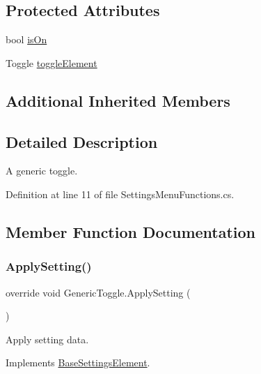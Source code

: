 \subsection*{Protected Attributes}
\begin{DoxyCompactItemize}
\item 
bool \hyperlink{class_generic_toggle_a04dcb99bc5c6b54f7bc880040c337622}{is\+On}
\item 
Toggle \hyperlink{class_generic_toggle_ad14be04e138af5b154ad5b9d9e98c1d1}{toggle\+Element}
\end{DoxyCompactItemize}
\subsection*{Additional Inherited Members}


\subsection{Detailed Description}
A generic toggle. 



Definition at line 11 of file Settings\+Menu\+Functions.\+cs.



\subsection{Member Function Documentation}
\mbox{\label{class_generic_toggle_af184e77b892617775fd0785fad7e750a}} 
\subsubsection{\texorpdfstring{Apply\+Setting()}{ApplySetting()}}
{\footnotesize\ttfamily override void Generic\+Toggle.\+Apply\+Setting (\begin{DoxyParamCaption}{ }\end{DoxyParamCaption})\hspace{0.3cm}{\ttfamily [virtual]}}



Apply setting data. 



Implements \hyperlink{class_base_settings_element_aecb484325110e7b97ec6e4d92d856ab1}{Base\+Settings\+Element}.



